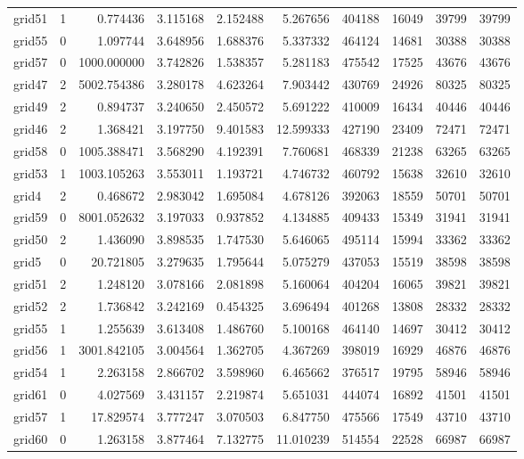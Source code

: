 \begin{longtable}{|l|r|r|r|r|r|r|r|r|r|}
grid51 & 1 & 0.774436 & 3.115168 & 2.152488 & 5.267656 & 404188 & 16049 & 39799 & 39799 \\
grid55 & 0 & 1.097744 & 3.648956 & 1.688376 & 5.337332 & 464124 & 14681 & 30388 & 30388 \\
grid57 & 0 & 1000.000000 & 3.742826 & 1.538357 & 5.281183 & 475542 & 17525 & 43676 & 43676 \\
grid47 & 2 & 5002.754386 & 3.280178 & 4.623264 & 7.903442 & 430769 & 24926 & 80325 & 80325 \\
grid49 & 2 & 0.894737 & 3.240650 & 2.450572 & 5.691222 & 410009 & 16434 & 40446 & 40446 \\
grid46 & 2 & 1.368421 & 3.197750 & 9.401583 & 12.599333 & 427190 & 23409 & 72471 & 72471 \\
grid58 & 0 & 1005.388471 & 3.568290 & 4.192391 & 7.760681 & 468339 & 21238 & 63265 & 63265 \\
grid53 & 1 & 1003.105263 & 3.553011 & 1.193721 & 4.746732 & 460792 & 15638 & 32610 & 32610 \\
grid4 & 2 & 0.468672 & 2.983042 & 1.695084 & 4.678126 & 392063 & 18559 & 50701 & 50701 \\
grid59 & 0 & 8001.052632 & 3.197033 & 0.937852 & 4.134885 & 409433 & 15349 & 31941 & 31941 \\
grid50 & 2 & 1.436090 & 3.898535 & 1.747530 & 5.646065 & 495114 & 15994 & 33362 & 33362 \\
grid5 & 0 & 20.721805 & 3.279635 & 1.795644 & 5.075279 & 437053 & 15519 & 38598 & 38598 \\
grid51 & 2 & 1.248120 & 3.078166 & 2.081898 & 5.160064 & 404204 & 16065 & 39821 & 39821 \\
grid52 & 2 & 1.736842 & 3.242169 & 0.454325 & 3.696494 & 401268 & 13808 & 28332 & 28332 \\
grid55 & 1 & 1.255639 & 3.613408 & 1.486760 & 5.100168 & 464140 & 14697 & 30412 & 30412 \\
grid56 & 1 & 3001.842105 & 3.004564 & 1.362705 & 4.367269 & 398019 & 16929 & 46876 & 46876 \\
grid54 & 1 & 2.263158 & 2.866702 & 3.598960 & 6.465662 & 376517 & 19795 & 58946 & 58946 \\
grid61 & 0 & 4.027569 & 3.431157 & 2.219874 & 5.651031 & 444074 & 16892 & 41501 & 41501 \\
grid57 & 1 & 17.829574 & 3.777247 & 3.070503 & 6.847750 & 475566 & 17549 & 43710 & 43710 \\
grid60 & 0 & 1.263158 & 3.877464 & 7.132775 & 11.010239 & 514554 & 22528 & 66987 & 66987 \\

\end{longtable}
